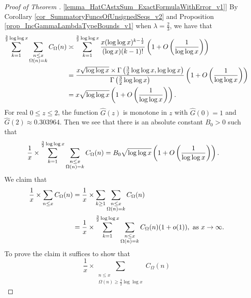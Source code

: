 \documentclass[11pt,reqno,a4letter]{article}
\newcommand{\hlocalref}[1]{\hyperref[#1]{\ref{#1}}}
\numberwithin{equation}{section}
\numberwithin{figure}{section}
\numberwithin{table}{section}
\theoremstyle{plain}
\numberwithin{theorem}{section}
\theoremstyle{definition}
\begin{document}
\begin{proof}[Proof of Theorem \hlocalref{lemma_HatCAstxSum_ExactFormulaWithError_v1}]  
By Corollary \hlocalref{cor_SummatoryFuncsOfUnsignedSeqs_v2} and 
Proposition \hlocalref{prop_IncGammaLambdaTypeBounds_v1} 
when $\lambda = \frac{2}{3}$, we have that 
\begin{align} 
\notag 
\sum_{k=1}^{\frac{3}{2} \log\log x} \sum_{\substack{n \leq x \\ \Omega(n) = k}} C_{\Omega}(n) & \asymp 
     \sum_{k=1}^{\frac{3}{2} \log\log x} \frac{x (\log\log x)^{k-\frac{1}{2}}}{(\log x) (k-1)!} 
     \left(1 + O\left(\frac{1}{\log\log x}\right)\right) \\ 
\notag 
     & = \frac{x \sqrt{\log\log x} \times \Gamma\left(\frac{3}{2} \log\log x, \log\log x\right)}{ 
     \Gamma\left(\frac{3}{2} \log\log x\right)} 
     \left(1 + O\left(\frac{1}{\log\log x}\right)\right) \\ 
\notag 
     & = 
     x \sqrt{\log\log x} \left(1 + O\left(\frac{1}{\log\log x}\right)\right). 
\end{align}
For real $0 \leq z \leq 2$, the function $\widehat{G}(z)$ is monotone in 
$z$ with $\widehat{G}(0) = 1$ and $\widehat{G}(2) \approx 0.303964$. 
Then we see that there is an absolute constant $B_0 > 0$ such that 
\begin{align} 
\notag 
\frac{1}{x} \times \sum_{k=1}^{\frac{3}{2} \log\log x} 
     \sum_{\substack{n \leq x \\ \Omega(n) = k}} C_{\Omega}(n) & = 
     B_0 \sqrt{\log\log x} \left(1 + O\left(\frac{1}{\log\log x}\right)\right). 
\end{align} 
We claim that 
\begin{align} 
\notag 
\frac{1}{x} \times \sum_{n \leq x} C_{\Omega}(n) & = \frac{1}{x} \times 
     \sum_{k \geq 1} \sum_{\substack{n \leq x \\ \Omega(n) = k}} C_{\Omega}(n) \\ 
\notag 
     & = 
     \frac{1}{x} \times \sum_{k=1}^{\frac{3}{2} \log\log x} 
     \sum_{\substack{n \leq x \\ \Omega(n) = k}} 
     C_{\Omega}(n) (1+o(1)), 
     \text{ as } x \rightarrow \infty. 
\end{align} 
To prove the claim it suffices to show that 
\begin{equation} 
\label{eqn_proof_tag_PartialSumsOver_HatCkx_EquivCond_v2} 
\frac{1}{x} \times 
     \sum\limits_{\substack{n \leq x \\ \Omega(n) \geq \frac{3}{2} \log\log x}} C_{\Omega}(n)

\end{equation}
\end{proof}
\end{document}
